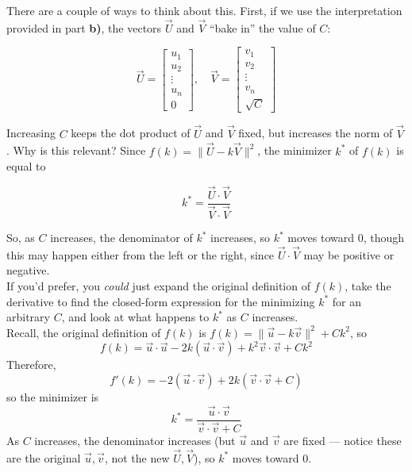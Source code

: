 \documentclass[11pt]{article}
\begin{document}
\begin{prob}[(13 pts)]
\begin{subprob}
\emptybox{3.5cm}

\begin{solution}
There are a couple of ways to think about this. First, if we use the interpretation provided in part \textbf{b)}, the vectors $\vec U$ and $\vec V$ ``bake in'' the value of $C$:

$$\vec U = \begin{bmatrix} u_1 \\ u_2 \\ \vdots \\ u_n \\ 0\end{bmatrix}, \quad \vec V = \begin{bmatrix} v_1 \\ v_2 \\ \vdots \\ v_n \\ \sqrt{C}\end{bmatrix}$$

Increasing $C$ keeps the dot product of $\vec U$ and $\vec V$ fixed, but increases the norm of $\vec V$. Why is this relevant? Since $f(k) = \lVert \vec U - k \vec V \rVert^2$, the minimizer $k^*$ of $f(k)$ is equal to

$$k^* = \frac{\vec U \cdot \vec V}{\vec V \cdot \vec V}$$

So, as $C$ increases, the denominator of $k^*$ increases, so $k^*$ moves toward $0$, though this may happen either from the left or the right, since $\vec U \cdot \vec V$ may be positive or negative. \\

If you'd prefer, you \textit{could} just expand the original definition of $f(k)$, take the derivative to find the closed-form expression for the minimizing $k^*$ for an arbitrary $C$, and look at what happens to $k^*$ as $C$ increases. \\

Recall, the original definition of $f(k)$ is $f(k)=\lVert \vec u - k \vec v \rVert^2 + C k^2$, so
\[
f(k)=\vec u \cdot \vec u - 2k(\vec u\cdot\vec v)+k^2\vec v \cdot \vec v+Ck^2
\]
Therefore,
\[
f'(k)=-2(\vec u\cdot\vec v)+2k(\vec v \cdot \vec v+C)
\]
so the minimizer is
\[
k^*=\frac{\vec u\cdot\vec v}{\vec v \cdot \vec v+C}
\]
As $C$ increases, the denominator increases (but $\vec u$ and $\vec v$ are fixed --- notice these are the original $\vec u, \vec v$, not the new $\vec U, \vec V$), so $k^*$ moves toward $0$.
\end{solution}
\end{subprob}


\end{prob}
\end{document}
